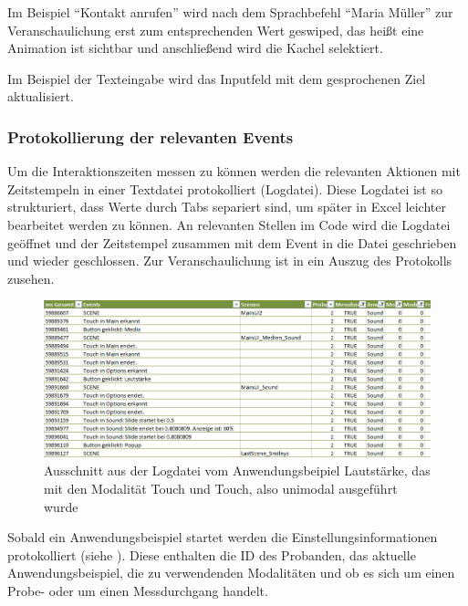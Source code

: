 Im Beispiel "`Kontakt anrufen"' wird nach dem Sprachbefehl "`Maria Müller"' zur Veranschaulichung erst zum entsprechenden Wert geswiped, das heißt eine Animation ist sichtbar und anschließend wird die Kachel selektiert. 

Im Beispiel der Texteingabe wird das Inputfeld mit dem gesprochenen Ziel aktualisiert.

\subsubsection[Protokollierung]{Protokollierung der relevanten Events}
Um die Interaktionszeiten messen zu können werden die relevanten Aktionen mit Zeitstempeln in einer Textdatei protokolliert (Logdatei). 
Diese Logdatei ist so strukturiert, dass Werte durch Tabs separiert sind, um später in Excel leichter bearbeitet werden zu können.
An relevanten Stellen im Code wird die Logdatei geöffnet und der Zeitstempel zusammen mit dem Event in die Datei geschrieben und wieder geschlossen. 
Zur Veranschaulichung ist in  ein Auszug des Protokolls zusehen.  
\begin{figure}[ht]
	\centering
		\includegraphics[width=1\textwidth]{img/Auszug_Logging_Sound_TT.JPG}
	\caption[Ausschnitt aus der Logdatei vom Anwendungsbeipiel Lautstärke]{Ausschnitt aus der Logdatei vom Anwendungsbeipiel Lautstärke, das mit den Modalität Touch und Touch, also unimodal ausgeführt wurde}
	\label{fig:Auszug_Logging_Sound_TT}
\end{figure}

Sobald ein Anwendungsbeispiel startet werden die Einstellungsinformationen protokolliert (siehe ). 
Diese enthalten die ID des Probanden, das aktuelle Anwendungsbeispiel, die zu verwendenden Modalitäten und ob es sich um einen Probe- oder um einen Messdurchgang handelt. 

